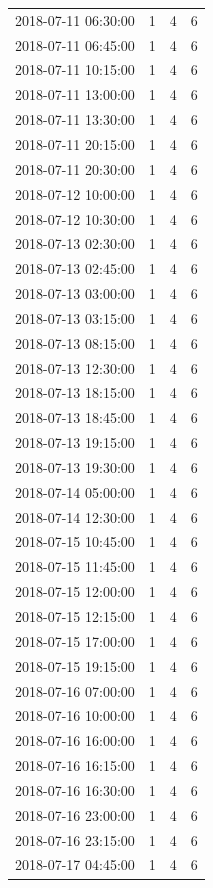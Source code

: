 \begin{tabular}{lrrr}
2018-07-11 06:30:00 & 1 & 4 & 6 \\
2018-07-11 06:45:00 & 1 & 4 & 6 \\
2018-07-11 10:15:00 & 1 & 4 & 6 \\
2018-07-11 13:00:00 & 1 & 4 & 6 \\
2018-07-11 13:30:00 & 1 & 4 & 6 \\
2018-07-11 20:15:00 & 1 & 4 & 6 \\
2018-07-11 20:30:00 & 1 & 4 & 6 \\
2018-07-12 10:00:00 & 1 & 4 & 6 \\
2018-07-12 10:30:00 & 1 & 4 & 6 \\
2018-07-13 02:30:00 & 1 & 4 & 6 \\
2018-07-13 02:45:00 & 1 & 4 & 6 \\
2018-07-13 03:00:00 & 1 & 4 & 6 \\
2018-07-13 03:15:00 & 1 & 4 & 6 \\
2018-07-13 08:15:00 & 1 & 4 & 6 \\
2018-07-13 12:30:00 & 1 & 4 & 6 \\
2018-07-13 18:15:00 & 1 & 4 & 6 \\
2018-07-13 18:45:00 & 1 & 4 & 6 \\
2018-07-13 19:15:00 & 1 & 4 & 6 \\
2018-07-13 19:30:00 & 1 & 4 & 6 \\
2018-07-14 05:00:00 & 1 & 4 & 6 \\
2018-07-14 12:30:00 & 1 & 4 & 6 \\
2018-07-15 10:45:00 & 1 & 4 & 6 \\
2018-07-15 11:45:00 & 1 & 4 & 6 \\
2018-07-15 12:00:00 & 1 & 4 & 6 \\
2018-07-15 12:15:00 & 1 & 4 & 6 \\
2018-07-15 17:00:00 & 1 & 4 & 6 \\
2018-07-15 19:15:00 & 1 & 4 & 6 \\
2018-07-16 07:00:00 & 1 & 4 & 6 \\
2018-07-16 10:00:00 & 1 & 4 & 6 \\
2018-07-16 16:00:00 & 1 & 4 & 6 \\
2018-07-16 16:15:00 & 1 & 4 & 6 \\
2018-07-16 16:30:00 & 1 & 4 & 6 \\
2018-07-16 23:00:00 & 1 & 4 & 6 \\
2018-07-16 23:15:00 & 1 & 4 & 6 \\
2018-07-17 04:45:00 & 1 & 4 & 6 \\

\end{tabular}
